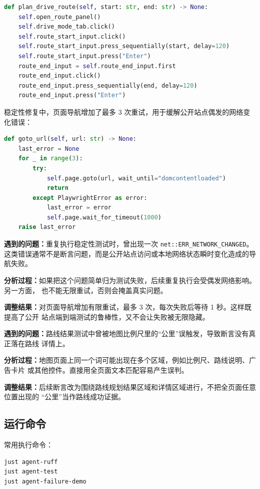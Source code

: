 \documentclass[UTF8,a4paper,12pt]{ctexart}
\newcommand{\problem}[1]{\par\noindent\textbf{遇到的问题：}#1\par}
\newcommand{\analysis}[1]{\par\noindent\textbf{分析过程：}#1\par}
\newcommand{\fix}[1]{\par\noindent\textbf{调整结果：}#1\par}
\begin{document}
\begin{lstlisting}[language=Python]
def plan_drive_route(self, start: str, end: str) -> None:
    self.open_route_panel()
    self.drive_mode_tab.click()
    self.route_start_input.click()
    self.route_start_input.press_sequentially(start, delay=120)
    self.route_start_input.press("Enter")
    route_end_input = self.route_end_input.first
    route_end_input.click()
    route_end_input.press_sequentially(end, delay=120)
    route_end_input.press("Enter")
\end{lstlisting}

稳定性修复中，页面导航增加了最多 3 次重试，用于缓解公开站点偶发的网络变化错误：

\begin{lstlisting}[language=Python]
def goto_url(self, url: str) -> None:
    last_error = None
    for _ in range(3):
        try:
            self.page.goto(url, wait_until="domcontentloaded")
            return
        except PlaywrightError as error:
            last_error = error
            self.page.wait_for_timeout(1000)
    raise last_error
\end{lstlisting}

\problem{重复执行稳定性测试时，曾出现一次 \texttt{net::ERR\_NETWORK\_CHANGED}。
这类错误通常不是断言问题，而是公开站点访问或本地网络状态瞬时变化造成的导航失败。}

\analysis{如果把这个问题简单归为测试失败，后续重复执行会受偶发网络影响。另一方面，
也不能无限重试，否则会掩盖真实问题。}

\fix{对页面导航增加有限重试，最多 3 次，每次失败后等待 1 秒。这样既提高了公开
站点端到端测试的鲁棒性，又不会让失败被无限隐藏。}

\problem{路线结果测试中曾被地图比例尺里的“公里”误触发，导致断言没有真正落在路线
详情上。}

\analysis{地图页面上同一个词可能出现在多个区域，例如比例尺、路线说明、广告卡片
或其他控件。直接用全页面文本匹配容易产生误判。}

\fix{后续断言改为围绕路线规划结果区域和详情区域进行，不把全页面任意位置出现的
“公里”当作路线成功证据。}

\subsection{运行命令}

常用执行命令：

\begin{lstlisting}[language=bash]
just agent-ruff
just agent-test
just agent-failure-demo
\end{lstlisting}
\end{document}
